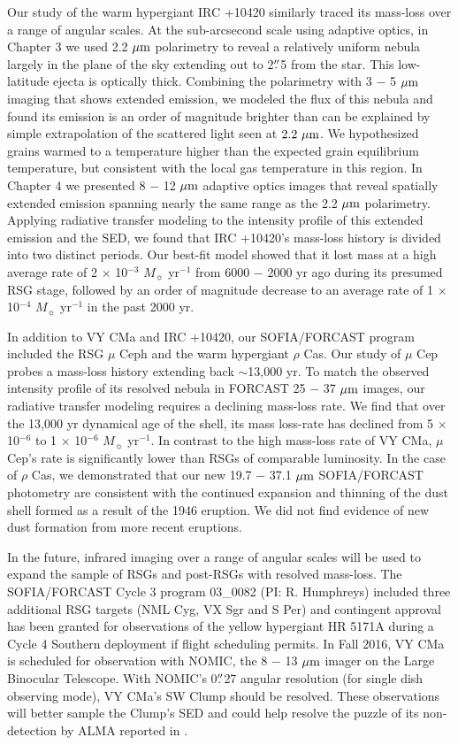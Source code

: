 Our study of the warm hypergiant IRC +10420 similarly traced its mass-loss over a range of angular scales.  At the sub-arcsecond scale using adaptive optics, in Chapter 3 we used 2.2 $\mbox{$\mu$m}$ polarimetry to reveal a relatively uniform nebula largely in the plane of the sky extending out to 2$\mbox{$.\!\!^{\prime\prime}$}$5 from the star.  This low-latitude ejecta is optically thick.  Combining the polarimetry with 3 $-$ 5 $\mbox{$\mu$m}$ imaging that shows extended emission, we modeled the flux of this nebula and found its emission is an order of magnitude brighter than can be explained by simple extrapolation of the scattered light seen at $2.2~\mbox{$\mu$m}$.  We hypothesized grains warmed to a temperature higher than the expected grain equilibrium temperature, but consistent with the local gas temperature in this region.  In Chapter 4 we presented 8 $-$ 12 $\mbox{$\mu$m}$ adaptive optics images that reveal spatially extended emission spanning nearly the same range as the 2.2 $\mbox{$\mu$m}$ polarimetry.  Applying radiative transfer modeling to the intensity profile of this extended emission and the SED, we found that IRC +10420's mass-loss history is divided into two distinct periods.  Our best-fit model showed that it lost mass at a high average rate of 2 $\times$ 10$^{-3}$ $M_{\sun}$ yr$^{-1}$ from 6000 $-$ 2000 yr ago during its presumed RSG stage, followed by an order of magnitude decrease to an average rate of 1 $\times$ 10$^{-4}$ $M_{\sun}$ yr$^{-1}$ in the past 2000 yr.

In addition to VY CMa and IRC +10420, our SOFIA/FORCAST program included the RSG $\mu$ Ceph and the warm hypergiant $\rho$ Cas.  Our study of $\mu$ Cep probes a mass-loss history extending back $\sim$13,000 yr.  To match the observed intensity profile of its resolved nebula in FORCAST 25 $-$ 37 $\mbox{$\mu$m}$ images, our radiative transfer modeling requires a declining mass-loss rate.  We find that over the 13,000 yr dynamical age of the shell, its mass loss-rate has declined from 5 $\times$ 10$^{-6}$ to 1 $\times$ 10$^{-6}$ $M_{\sun}$ yr$^{-1}$.  In contrast to the high mass-loss rate of VY CMa, $\mu$ Cep's rate is significantly lower than RSGs of comparable luminosity.  In the case of $\rho$ Cas, we demonstrated that our new 19.7 $-$ 37.1 $\mbox{$\mu$m}$ SOFIA/FORCAST photometry are consistent with the continued expansion and thinning of the dust shell formed as a result of the 1946 eruption.  We did not find evidence of new dust formation from more recent eruptions.

In the future, infrared imaging over a range of angular scales will be used to expand the sample of RSGs and post-RSGs with resolved mass-loss.  The SOFIA/FORCAST Cycle 3 program 03\_0082 (PI: R. Humphreys) included three additional RSG targets (NML Cyg, VX Sgr and S Per) and contingent approval has been granted for observations of the yellow hypergiant HR 5171A during a Cycle 4 Southern deployment if flight scheduling permits.  In Fall 2016, VY CMa is scheduled for observation with NOMIC, the 8 $-$ 13 $\mbox{$\mu$m}$ imager on the Large Binocular Telescope.  With NOMIC's 0$\mbox{$.\!\!^{\prime\prime}$}$27 angular resolution (for single dish observing mode), VY CMa's SW Clump should be resolved.  These observations will better sample the Clump's SED and could help resolve the puzzle of its non-detection by ALMA reported in \citet{OGorman:2015}.  

